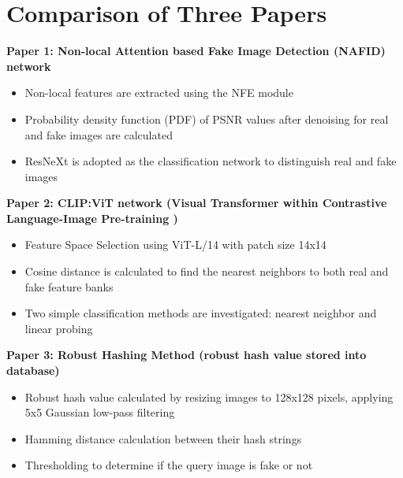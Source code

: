 \documentclass[a4paper,14pt]{report}
\begin{document}
\section{Comparison of Three Papers}
\vspace{0.5cm}
\textbf{Paper 1: Non-local Attention based Fake Image Detection (NAFID) network}
\begin{itemize}
    \item Non-local features are extracted using the NFE module
    \item Probability density function (PDF) of PSNR values after denoising for real and fake images are calculated
    \item ResNeXt is adopted as the classification network to distinguish real and fake images
\end{itemize}
\vspace{0.5cm}
\textbf{Paper 2: CLIP:ViT network (Visual Transformer within Contrastive Language-Image Pre-training \cite{2})}
\begin{itemize}
    \item Feature Space Selection using ViT-L/14 with patch size 14x14
    \item Cosine distance is calculated to find the nearest neighbors to both real and fake feature banks
    \item Two simple classification methods are investigated: nearest neighbor and linear probing
\end{itemize}
\vspace{0.5cm}
\textbf{Paper 3: Robust Hashing Method (robust hash value stored into  database)}
\begin{itemize}
    \item Robust hash value calculated by resizing images to 128x128 pixels, applying 5x5 Gaussian low-pass filtering
    \item Hamming distance calculation between their hash strings
    \item Thresholding to determine if the query image is fake or not
\end{itemize}
\end{document}
